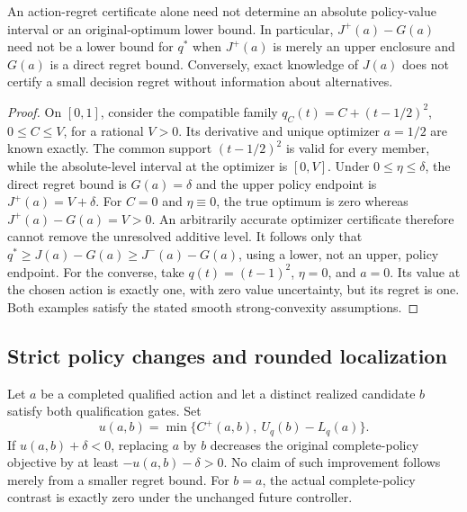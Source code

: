 \begin{proposition}
\label{prop:separategates126}
An action-regret certificate alone need not determine an absolute
policy-value interval or an original-optimum lower bound.  In
particular, $J^+(a)-G(a)$ need not be a lower bound for $q^*$ when
$J^+(a)$ is merely an upper enclosure and $G(a)$ is a direct regret
bound.  Conversely, exact knowledge of $J(a)$ does not certify a
small decision regret without information about alternatives.
\end{proposition}

\begin{proof}
On $[0,1]$, consider the compatible family
$q_C(t)=C+(t-1/2)^2$, $0\le C\le V$, for a rational $V>0$.
Its derivative and unique optimizer $a=1/2$ are known exactly.  The
common support $(t-1/2)^2$ is valid for every member, while the
absolute-level interval at the optimizer is $[0,V]$.  Under
$0\le\eta\le\delta$, the direct regret bound is $G(a)=\delta$
and the upper policy endpoint is $J^+(a)=V+\delta$.  For $C=0$
and $\eta\equiv0$, the true optimum is zero whereas
$J^+(a)-G(a)=V>0$.  An arbitrarily accurate optimizer certificate
therefore cannot remove the unresolved additive level.  It follows
only that $q^*\ge J(a)-G(a)\ge J^-(a)-G(a)$, using a lower,
not an upper, policy endpoint.  For the converse, take
$q(t)=(t-1)^2$, $\eta=0$, and $a=0$.  Its value at the chosen
action is exactly one, with zero value uncertainty, but its regret
is one.  Both examples satisfy the stated smooth strong-convexity
assumptions.
\end{proof}

\subsection{Strict policy changes and rounded localization}

\begin{proposition}
\label{prop:strictchange126}
Let $a$ be a completed qualified action and let a distinct realized
candidate $b$ satisfy both qualification gates.  Set
\[
 u(a,b)=\min\{C^+(a,b),\ U_q(b)-L_q(a)\}.
\]
If $u(a,b)+\delta<0$, replacing $a$ by $b$ decreases the original
complete-policy objective by at least
$-u(a,b)-\delta>0$.  No claim of such improvement follows merely
from a smaller regret bound.  For $b=a$, the actual complete-policy
contrast is exactly zero under the unchanged future controller.
\end{proposition}

